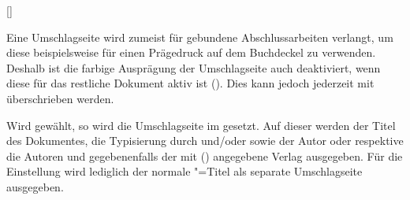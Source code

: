 \begin{Declaration*}{}
\begin{Declaration*}{}
\begin{Declaration*}{}
\begin{Declaration}{[]}
\begin{Declaration}[v2.02]{%
}
\begin{Declaration}{}
\begin{Declaration}[v2.02]{}{%
}
\begin{Declaration}[v2.03]{}{%
}
\begin{Declaration}[v2.03]{}{%
}
\begin{Declaration}[v2.03]{%
}{}
\begin{Declaration}[v2.03]{%
}{}
\begin{Declaration}[v2.03]{}{%
}
\begin{Declaration}[v2.03]{}{%
}
\begin{Declaration}[v2.03]{}{%
}
\printdeclarationlist%
%
%
Eine Umschlagseite wird zumeist für gebundene Abschlussarbeiten verlangt, um 
diese beispielsweise für einen Prägedruck auf dem Buchdeckel zu verwenden. 
Deshalb ist die farbige Ausprägung der Umschlagseite auch deaktiviert, wenn 
diese für das restliche Dokument aktiv ist (). Dies kann 
jedoch jederzeit mit  überschrieben werden.

Wird  gewählt, so wird die Umschlagseite im \TUDCD 
gesetzt. Auf dieser werden der Titel des Dokumentes, die Typisierung 
durch  und/oder  sowie der Autor oder respektive 
die Autoren und gegebenenfalls der mit ()
angegebene Verlag ausgegeben.
Für die Einstellung  wird lediglich der normale 
\KOMAScript"=Titel als separate Umschlagseite ausgegeben. 


\end{Declaration}
\end{Declaration}
\end{Declaration}
\end{Declaration}
\end{Declaration}
\end{Declaration}
\end{Declaration}
\end{Declaration}
\end{Declaration}
\end{Declaration}
\end{Declaration}
\end{Declaration*}
\end{Declaration*}
\end{Declaration*}
